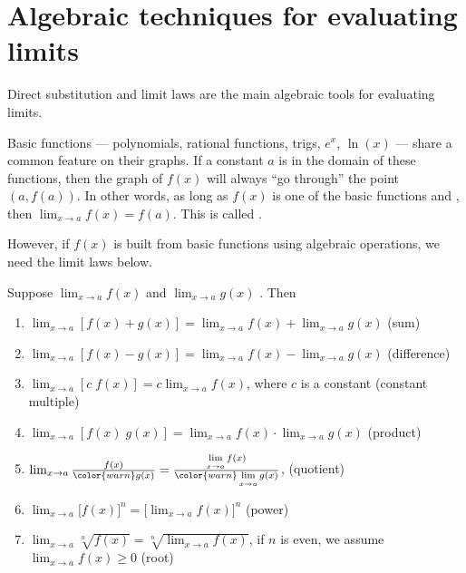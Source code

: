 \documentclass[../main.tex]{subfiles}
\begin{document}
 \section{Algebraic techniques for evaluating limits}
Direct substitution and limit laws are the main algebraic tools for evaluating limits.

\faStar{} Basic functions --- polynomials, rational functions, trigs, \(e^{x}\), \(\ln(x)\) --- share a common feature on their graphs. If a constant \(a\) is in the domain of these functions, then the graph of \(f(x)\) will always \enquote{go through} the point \((a,f(a))\). In other words, as long as \(f(x)\) is one of the basic functions and , then \(\lim_{x \to a} f(x) = f(a)\). This is called .

However, if \(f(x)\) is built from basic functions using algebraic operations, we need the limit laws below.

\begin{thm} \label{thm:limit-laws}
  Suppose \(\lim_{x \to a} f(x)\) and \(\lim_{x \to a} g(x)\) . Then
  \begin{enumerate}[label=(\arabic*)]
    \item \(\lim_{x \to a} [f(x) + g(x)] = \lim_{x \to a} f(x) + \lim_{x \to a} g(x)\) \hfill (sum)
    \item \(\lim_{x \to a} [f(x) - g(x)] = \lim_{x \to a} f(x) - \lim_{x \to a} g(x)\) \hfill (difference)
    \item \(\lim_{x \to a} [c \; f(x)] = c \lim_{x \to a} f(x)\), where \(c\) is a constant \hfill (constant multiple)
    \item \(\lim_{x \to a} [f(x) \; g(x)] = \lim_{x \to a} f(x) \cdot \lim_{x \to a} g(x)\) \hfill (product)
    \item \(\lim_{x \to a} \frac{f(x)}{{\color{warn} g(x)}} = \frac{\lim\limits_{x \to a} f(x)}{{\color{warn} \lim\limits_{x \to a} g(x)}}\), \quad {} \hfill (quotient)
    \item \(\lim_{x \to a} \bigg[f(x)\bigg]^{n} = \bigg[ \lim_{x \to a} f(x) \bigg]^{n}\) \hfill (power)
    \item \(\lim_{x \to a} \sqrt[n]{f(x)} = \sqrt[n]{\lim_{x \to a} f(x)}\), \quad if \(n\) is even, we assume {\(\lim_{x \to a} f(x) \ge 0\)} \hfill (root)
  \end{enumerate}

\end{thm}
\end{document}
